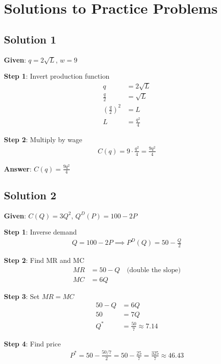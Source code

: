 \documentclass[12pt]{article}
\begin{document}
\section{Solutions to Practice Problems}

\subsection{Solution 1}

\textbf{Given}: $q = 2\sqrt{L}$, $w = 9$

\textbf{Step 1}: Invert production function
\begin{align*}
q &= 2\sqrt{L} \\
\frac{q}{2} &= \sqrt{L} \\
\left(\frac{q}{2}\right)^2 &= L \\
L &= \frac{q^2}{4}
\end{align*}

\textbf{Step 2}: Multiply by wage
\begin{align*}
C(q) = 9 \cdot \frac{q^2}{4} = \frac{9q^2}{4}
\end{align*}

\textbf{Answer}: $C(q) = \frac{9q^2}{4}$

\subsection{Solution 2}

\textbf{Given}: $C(Q) = 3Q^2$, $Q^D(P) = 100 - 2P$

\textbf{Step 1}: Inverse demand
\begin{align*}
Q = 100 - 2P \implies P^D(Q) = 50 - \frac{Q}{2}
\end{align*}

\textbf{Step 2}: Find MR and MC
\begin{align*}
MR &= 50 - Q \quad \text{(double the slope)} \\
MC &= 6Q
\end{align*}

\textbf{Step 3}: Set $MR = MC$
\begin{align*}
50 - Q &= 6Q \\
50 &= 7Q \\
Q^* &= \frac{50}{7} \approx 7.14
\end{align*}

\textbf{Step 4}: Find price
\begin{align*}
P^* = 50 - \frac{50/7}{2} = 50 - \frac{25}{7} = \frac{325}{7} \approx 46.43
\end{align*}
\end{document}
